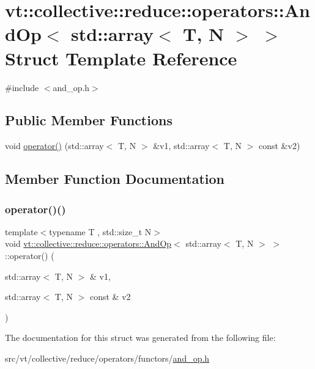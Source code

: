 \hypertarget{structvt_1_1collective_1_1reduce_1_1operators_1_1_and_op_3_01std_1_1array_3_01_t_00_01_n_01_4_01_4}{}\section{vt\+:\+:collective\+:\+:reduce\+:\+:operators\+:\+:And\+Op$<$ std\+:\+:array$<$ T, N $>$ $>$ Struct Template Reference}
\label{structvt_1_1collective_1_1reduce_1_1operators_1_1_and_op_3_01std_1_1array_3_01_t_00_01_n_01_4_01_4}


{\ttfamily \#include $<$and\+\_\+op.\+h$>$}

\subsection*{Public Member Functions}
\begin{DoxyCompactItemize}
\item 
void \hyperlink{structvt_1_1collective_1_1reduce_1_1operators_1_1_and_op_3_01std_1_1array_3_01_t_00_01_n_01_4_01_4_a7e224e55e2b7e5f77d7651504775acee}{operator()} (std\+::array$<$ T, N $>$ \&v1, std\+::array$<$ T, N $>$ const \&v2)
\end{DoxyCompactItemize}


\subsection{Member Function Documentation}
\mbox{\label{structvt_1_1collective_1_1reduce_1_1operators_1_1_and_op_3_01std_1_1array_3_01_t_00_01_n_01_4_01_4_a7e224e55e2b7e5f77d7651504775acee}} 
\subsubsection{\texorpdfstring{operator()()}{operator()()}}
{\footnotesize\ttfamily template$<$typename T , std\+::size\+\_\+t N$>$ \\
void \hyperlink{structvt_1_1collective_1_1reduce_1_1operators_1_1_and_op}{vt\+::collective\+::reduce\+::operators\+::\+And\+Op}$<$ std\+::array$<$ T, N $>$ $>$\+::operator() (\begin{DoxyParamCaption}\item[{std\+::array$<$ T, N $>$ \&}]{v1,  }\item[{std\+::array$<$ T, N $>$ const \&}]{v2 }\end{DoxyParamCaption})\hspace{0.3cm}{\ttfamily [inline]}}



The documentation for this struct was generated from the following file\+:\begin{DoxyCompactItemize}
\item 
src/vt/collective/reduce/operators/functors/\hyperlink{and__op_8h}{and\+\_\+op.\+h}\end{DoxyCompactItemize}
